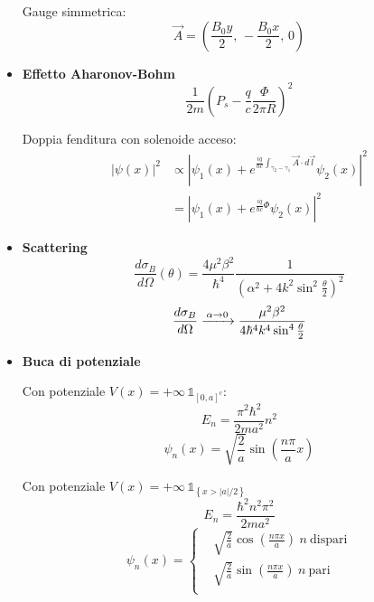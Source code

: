 \documentclass{article}
\newcommand{\myrightarrow}[1]{\xrightarrow{\makebox[2em][c]{$\scriptstyle#1$}}}
\begin{document}
\begin{footnotesize}
\begin{multicols*}{3}
\begin{itemize}[leftmargin=*]
		Gauge simmetrica:
		\[\vec{A} = \left(\frac{B_0y}{2},\, -\frac{B_0x}{2},\,0\right)\]

	\item \textbf{Effetto Aharonov-Bohm}
		\[\frac{1}{2m}\left(P_s - \frac{q}{c}\frac{\Phi }{2\pi R}\right)^2\]

		Doppia fenditura con solenoide acceso:
		\begin{align*}\left|\psi (x)\right|^2 &\propto \left|\psi _1(x) + e^{\frac{iq}{\hbar c} \int_{\gamma _2-\gamma _1}\vec{A}\cdot d\vec{l}} \psi _2(x)\right|^2  \\
		&=\left| \psi _1(x) + e^{\frac{iq}{\hbar c} \Phi } \psi _2(x)\right|^2 \end{align*}

	\item \textbf{Scattering}
		\[\frac{d\sigma _B}{d\Omega }(\theta ) = \frac{4\mu ^2\beta ^2}{\hbar ^4} \frac{1}{\left(\alpha ^2 + 4k^2\sin^2\frac{\theta }{2}\right)^2}\]
		\[\frac{d\sigma _B}{d\Omega } \myrightarrow{\alpha  \rightarrow 0} \frac{\mu ^2\beta ^2}{4\hbar ^4k^4\sin^4{\frac{\theta }{2}}}\]


	\item \textbf{Buca di potenziale}

		Con potenziale $V(x) = +\infty \,\mathds{1}_{[0,a]^c}$:
		\[E_n = \frac{\pi ^2\hbar ^2}{2ma^2}n^2\]
		\[\psi _n(x) = \sqrt{\frac{2}{a}} \sin\left(\frac{n\pi }{a}x\right)\]

		Con potenziale $V(x) = +\infty \, \mathds{1}_{\left\{x > |a|/2\right\}}$
		\[E_n = \frac{\hbar ^2n^2\pi ^2}{2ma^2}\]
		\[\psi _n(x) = \left\{\begin{aligned}
		&\sqrt{\frac{2}{a}}\cos\left(\frac{n\pi x}{a}\right)\hspace{3pt}n\ \mathrm{dispari}\\
		&\sqrt{\frac{2}{a}}\sin\left(\frac{n\pi x}{a}\right)\hspace{3pt}n\ \mathrm{pari}\\
		\end{aligned}\right.\]




\end{itemize}
\end{multicols*}
\end{footnotesize}
\end{document}
